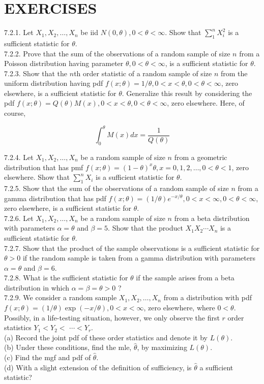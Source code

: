 \section*{EXERCISES}
7.2.1. Let $X_{1}, X_{2}, \ldots, X_{n}$ be iid $N(0, \theta), 0<\theta<\infty$. Show that $\sum_{1}^{n} X_{i}^{2}$ is a sufficient statistic for $\theta$.\\
7.2.2. Prove that the sum of the observations of a random sample of size $n$ from a Poisson distribution having parameter $\theta, 0<\theta<\infty$, is a sufficient statistic for $\theta$.\\
7.2.3. Show that the $n$th order statistic of a random sample of size $n$ from the uniform distribution having pdf $f(x ; \theta)=1 / \theta, 0<x<\theta, 0<\theta<\infty$, zero elsewhere, is a sufficient statistic for $\theta$. Generalize this result by considering the pdf $f(x ; \theta)=Q(\theta) M(x), 0<x<\theta, 0<\theta<\infty$, zero elsewhere. Here, of course,

$$
\int_{0}^{\theta} M(x) d x=\frac{1}{Q(\theta)}
$$

7.2.4. Let $X_{1}, X_{2}, \ldots, X_{n}$ be a random sample of size $n$ from a geometric distribution that has pmf $f(x ; \theta)=(1-\theta)^{x} \theta, x=0,1,2, \ldots, 0<\theta<1$, zero elsewhere. Show that $\sum_{1}^{n} X_{i}$ is a sufficient statistic for $\theta$.\\
7.2.5. Show that the sum of the observations of a random sample of size $n$ from a gamma distribution that has pdf $f(x ; \theta)=(1 / \theta) e^{-x / \theta}, 0<x<\infty, 0<\theta<\infty$, zero elsewhere, is a sufficient statistic for $\theta$.\\
7.2.6. Let $X_{1}, X_{2}, \ldots, X_{n}$ be a random sample of size $n$ from a beta distribution with parameters $\alpha=\theta$ and $\beta=5$. Show that the product $X_{1} X_{2} \cdots X_{n}$ is a sufficient statistic for $\theta$.\\
7.2.7. Show that the product of the sample observations is a sufficient statistic for $\theta>0$ if the random sample is taken from a gamma distribution with parameters $\alpha=\theta$ and $\beta=6$.\\
7.2.8. What is the sufficient statistic for $\theta$ if the sample arises from a beta distribution in which $\alpha=\beta=\theta>0$ ?\\
7.2.9. We consider a random sample $X_{1}, X_{2}, \ldots, X_{n}$ from a distribution with pdf $f(x ; \theta)=(1 / \theta) \exp (-x / \theta), 0<x<\infty$, zero elsewhere, where $0<\theta$. Possibly, in a life-testing situation, however, we only observe the first $r$ order statistics $Y_{1}<Y_{2}<$ $\cdots<Y_{r}$.\\
(a) Record the joint pdf of these order statistics and denote it by $L(\theta)$.\\
(b) Under these conditions, find the mle, $\hat{\theta}$, by maximizing $L(\theta)$.\\
(c) Find the mgf and pdf of $\hat{\theta}$.\\
(d) With a slight extension of the definition of sufficiency, is $\hat{\theta}$ a sufficient statistic?

